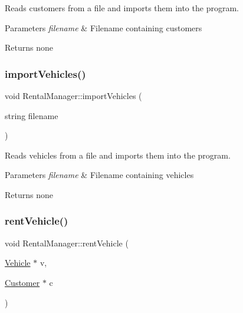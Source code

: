 Reads customers from a file and imports them into the program.


\begin{DoxyParams}{Parameters}
{\em filename} & Filename containing customers \\
\hline
\end{DoxyParams}
\begin{DoxyReturn}{Returns}
none 
\end{DoxyReturn}
\mbox{\label{class_rental_manager_a4c4b5e823b02baccd591f91448d7b1d7}} 
\subsubsection{\texorpdfstring{import\+Vehicles()}{importVehicles()}}
{\footnotesize\ttfamily void Rental\+Manager\+::import\+Vehicles (\begin{DoxyParamCaption}\item[{string}]{filename }\end{DoxyParamCaption})}

Reads vehicles from a file and imports them into the program.


\begin{DoxyParams}{Parameters}
{\em filename} & Filename containing vehicles \\
\hline
\end{DoxyParams}
\begin{DoxyReturn}{Returns}
none 
\end{DoxyReturn}
\mbox{\label{class_rental_manager_ac0d7830b092f29aa063deba6ff422f24}} 
\subsubsection{\texorpdfstring{rent\+Vehicle()}{rentVehicle()}}
{\footnotesize\ttfamily void Rental\+Manager\+::rent\+Vehicle (\begin{DoxyParamCaption}\item[{\hyperlink{class_vehicle}{Vehicle} $\ast$}]{v,  }\item[{\hyperlink{class_customer}{Customer} $\ast$}]{c }\end{DoxyParamCaption})}

